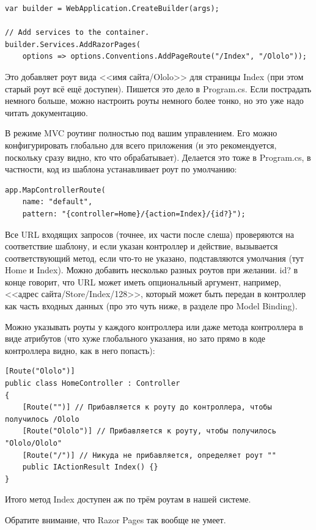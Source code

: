 \documentclass[a5paper]{article}
\begin{document}
\begin{verbatim}
var builder = WebApplication.CreateBuilder(args);

// Add services to the container.
builder.Services.AddRazorPages(
    options => options.Conventions.AddPageRoute("/Index", "/Ololo"));
\end{verbatim}

Это добавляет роут вида <<имя сайта/Ololo>> для страницы Index (при этом старый роут всё ещё доступен). Пишется это дело в Program.cs. Если пострадать немного больше, можно настроить роуты немного более тонко, но это уже надо читать документацию.

В режиме MVC роутинг полностью под вашим управлением. Его можно конфигурировать глобально для всего приложения (и это рекомендуется, поскольку сразу видно, кто что обрабатывает). Делается это тоже в Program.cs, в частности, код из шаблона устанавливает роут по умолчанию:

\begin{verbatim}
app.MapControllerRoute(
    name: "default",
    pattern: "{controller=Home}/{action=Index}/{id?}");
\end{verbatim}

Все URL входящих запросов (точнее, их части после слеша) проверяются на соответствие шаблону, и если указан контроллер и действие, вызывается соответствующий метод, если что-то не указано, подставляются умолчания (тут Home и Index). Можно добавить несколько разных роутов при желании. id? в конце говорит, что URL может иметь опциональный аргумент, например, <<адрес сайта/Store/Index/128>>, который может быть передан в контроллер как часть входных данных (про это чуть ниже, в разделе про Model Binding).

Можно указывать роуты у каждого контроллера или даже метода контроллера в виде атрибутов (что хуже глобального указания, но зато прямо в коде контроллера видно, как в него попасть):

\begin{verbatim}
[Route("Ololo")]
public class HomeController : Controller
{
    [Route("")] // Прибавляется к роуту до контроллера, чтобы получилось /Ololo
    [Route("Ololo")] // Прибавляется к роуту, чтобы получилось "Ololo/Ololo"
    [Route("/")] // Никуда не прибавляется, определяет роут ""
    public IActionResult Index() {}
}
\end{verbatim}

Итого метод Index доступен аж по трём роутам в нашей системе.

Обратите внимание, что Razor Pages так вообще не умеет.
\end{document}

